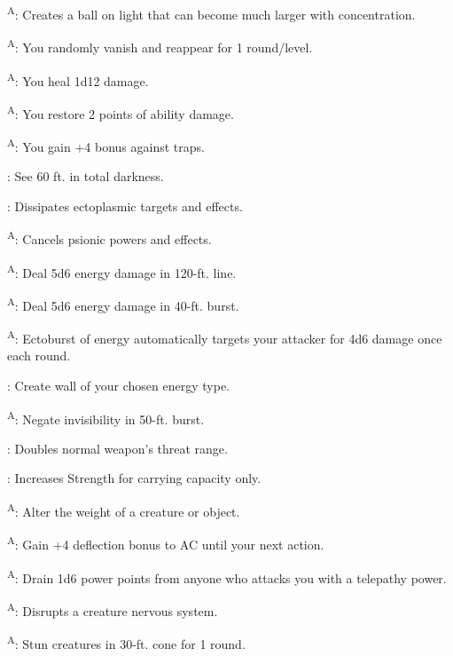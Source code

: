 \textsuperscript{A}: Creates a ball on light that can become much larger with concentration.

\textsuperscript{A}: You randomly vanish and reappear for 1 round/level.

\textsuperscript{A}: You heal 1d12 damage.

\textsuperscript{A}: You restore 2 points of ability damage.

\textsuperscript{A}: You gain +4 bonus against traps.

: See 60 ft. in total darkness.

: Dissipates ectoplasmic targets and effects.

\textsuperscript{A}: Cancels psionic powers and effects.

\textsuperscript{A}: Deal 5d6 energy damage in 120-ft. line.

\textsuperscript{A}: Deal 5d6 energy damage in 40-ft. burst.

\textsuperscript{A}: Ectoburst of energy automatically targets your attacker for 4d6 damage once each round.

: Create wall of your chosen energy type.

\textsuperscript{A}: Negate invisibility in 50-ft. burst.

: Doubles normal weapon’s threat range.

: Increases Strength for carrying capacity only.

\textsuperscript{A}: Alter the weight of a creature or object.

\textsuperscript{A}: Gain +4 deflection bonus to AC until your next action.

\textsuperscript{A}: Drain 1d6 power points from anyone who attacks you with a telepathy power.

\textsuperscript{A}: Disrupts a creature nervous system.

\textsuperscript{A}: Stun creatures in 30-ft. cone for 1 round.

